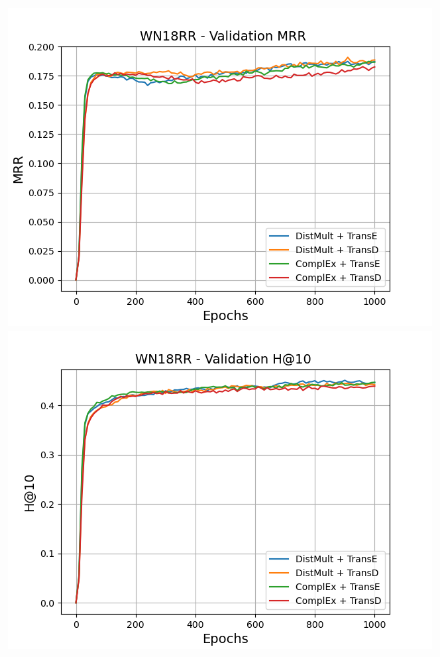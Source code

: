 \begin{figure}[H]
    \centering
    \begin{minipage}{.45\textwidth}
      \centering
      \includegraphics[width=0.9\linewidth]{figures/results/gan_train/not_pretrained/random/wn18rr/epochs1000/random_wn18rr_mrrs.png}
    \end{minipage}%
    \begin{minipage}{.45\textwidth}
      \centering
      \includegraphics[width=0.9\linewidth]{figures/results/gan_train/not_pretrained/random/wn18rr/epochs1000/random_wn18rr_hit10.png}
    \end{minipage}
    

\end{figure}

